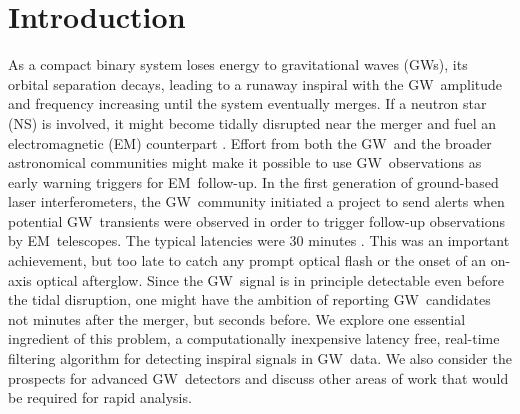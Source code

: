 \documentclass[preprint2]{aastex}
\newcommand{\NS}{NS}
\newcommand{\GW}{GW}%
\newcommand{\EM}{EM}%
\begin{document}
\section{Introduction}

As a compact binary system loses energy to gravitational waves (\GW{}s), its
orbital separation decays, leading to a runaway inspiral with the \GW\
amplitude and frequency increasing until the system eventually merges.  If a
neutron star (\NS) is involved, it might become tidally disrupted near the
merger and fuel an electromagnetic (\EM) counterpart \citep{shibata:2007}.
Effort from both the \GW\ and the broader astronomical communities might make
it possible to use \GW\ observations as early warning triggers for \EM\
follow-up. In the first generation of ground-based laser interferometers, the
\GW\ community initiated a project to send alerts when potential \GW\
transients were observed in order to trigger follow-up observations by \EM\
telescopes.  The typical latencies were 30 minutes \citep{HugheyGWPAW2011}.
This was an important achievement, but too late to catch any prompt optical flash
or the onset of an on-axis optical afterglow.  Since the \GW\ signal is in principle detectable even before the tidal
disruption, one might have the ambition of reporting \GW\ candidates not minutes
after the merger, but seconds before.  We explore one essential ingredient of
this problem, a computationally inexpensive latency free, real-time filtering
algorithm for detecting inspiral signals in \GW\ data.  We also consider the
prospects for advanced \GW\ detectors and discuss other areas of work that would
be required for rapid analysis.
\end{document}
